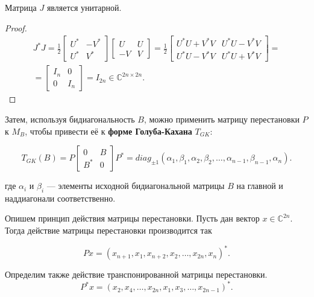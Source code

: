 \begin{claim} \label{J-unitary}
    Матрица \(J\) является унитарной.
\end{claim}
\begin{proof}
    \begin{equation*}
        \begin{split}
            J^* J= \frac{1}{2} \begin{bmatrix} U^* &-V^*\\ U^* & V^* \end{bmatrix} \begin{bmatrix} U & U \\ -V & V \end{bmatrix} = \frac{1}{2} \begin{bmatrix}
        U^*U+V^*V & U^*U-V^*V \\ U^*U-V^*V & U^*U+V^*V
    \end{bmatrix} =\\[6pt] = \begin{bmatrix}
        I_n & 0 \\ 0 & I_n
    \end{bmatrix} = I_{2n} \in \mathbb{C}^{2n \times 2n}.
        \end{split}
    \end{equation*}
\end{proof}

Затем, используя бидиагональность \( B \), можно применить матрицу перестановки \( P \) к \( M_B \), чтобы привести её к \textbf{форме Голуба-Кахана} \( T_{GK} \):

\begin{equation}
T_{GK}(B) = P \begin{bmatrix} 0 & B \\ B^* & 0 \end{bmatrix} P^* = diag_{\pm 1}(\alpha_1,\beta_1,\alpha_2,\beta_2,\dots,\alpha_{n-1},\beta_{n-1},\alpha_{n}).
\end{equation}

где \( \alpha_i \) и \( \beta_i \) — элементы исходной бидиагональной матрицы \( B \) на главной и наддиагонали соответственно. 

Опишем принцип действия матрицы перестановки. Пусть дан вектор \(x \in \mathbb{C}^{2n} \). Тогда действие матрицы перестановки производится так

\begin{equation}
    Px=(x_{n+1},x_1, x_{n+2},x_2,\dots,x_{2n},x_n)^*.
\end{equation}
\begin{note}
    Определим также действие транспонированной матрицы перестановки.
    \begin{equation}
        P^*x=(x_2,x_4,\dots,x_{2n},x_1,x_3,\dots,x_{2n-1})^*.
    \end{equation}
\end{note}

